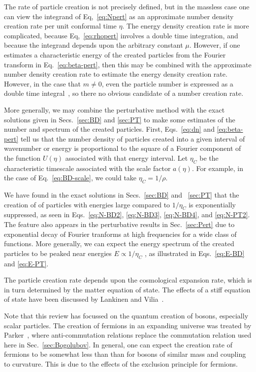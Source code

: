 \documentclass[eqsecnum,floats,aps,prd,floatfix,titlepage,tightenlines]{revtex4}
\begin{document}
The rate of particle creation is not precisely defined, but in the massless case one can  view the
integrand of Eq,~\eqref{eq:Npert} as an approximate number density creation rate per
unit conformal time $\eta$. The energy density creation rate is more complicated, because
Eq,~\eqref{eq:rhopert} involves a double time integration, and because the integrand depends
upon the arbitrary constant $\mu$. However, if one estimates a characteristic energy of the created 
particles from the Fourier transform in Eq.~\eqref{eq:beta-pert}, then this may be combined with
the  approximate number density creation rate to estimate the energy density creation rate.
However, in the case that $m \not= 0$, even the particle number is expressed as a double 
time integral~\cite{BD2}, so there no obvious candidate of a number creation rate.

More generally, we may combine the perturbative method with the exact solutions given in
Secs.~\ref{sec:BD} and \ref{sec:PT} to make some estimates of the number and spectrum
of the created particles. First, Eqs.~\eqref{eq:dn}  and \eqref{eq:beta-pert} tell us that the
number density of particles created into a given interval of wavenumber or energy is proportional
to the square of a Fourier component of the function $U(\eta)$ associated with that energy interval.
Let $\eta_C$ be the characteristic timescale associated with the scale factor $a(\eta)$. For example, in
the case of Eq.~\eqref{eq:BD-scale}, we could take $\eta_C = 1/\rho$. 

We have found in the exact solutions in Secs.~\ref{sec:BD} and ~\ref{sec:PT} that the creation of
of particles with energies large compared to $1/\eta_C$ is exponentially suppressed, as seen in 
Eqs.~\eqref{eq:N-BD2}, \eqref{eq:N-BD3}, \eqref{eq:N-BD4}, and \eqref{eq:N-PT2}. The feature
also appears in the perturbative results in Sec.~\ref{sec:Pert} due to exponential decay of Fourier
tranforms at high frequencies for a wide class of functions. More generally, we can expect the
energy spectrum of the created particles to be peaked near energies $E \propto 1/\eta_C$ , as 
illustrated in Eqs.~\eqref {eq:E-BD} and \eqref{eq:E-PT}. 

The particle creation rate depends upon the cosmological expansion rate, which is in turn determined
by the matter equation of state. The effects of a stiff equation of state have been discussed by
Lankinen and Vilia~\cite{Lankinen2017}.   

Note that this review has focussed on the quantum creation of bosons, especially scalar particles.
The creation of fermions in an expanding universe was treated by Parker~\cite{Parker71}, where
anti-commutation relations replace the commutation relation used here in Sec.~\ref{sec:Bogolubov}.
In general, one can expect the creation rate of fermions to be somewhat less than than for bosons
of similar mass and coupling to curvature. This is due to the effects of the exclusion principle for
fermions.
\end{document}
